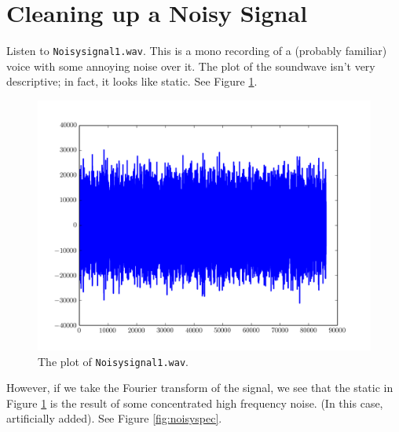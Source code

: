 

\section*{Cleaning up a Noisy Signal}

Listen to \texttt{Noisysignal1.wav}.
This is a mono recording of a (probably familiar) voice with some annoying noise over it.
The plot of the soundwave isn't very descriptive; in fact, it looks like static.
See Figure \ref{fig:noisysignal}.

\begin{figure}
\centering
\includegraphics[width=\textwidth]{figures/noisy}
\caption{The plot of \texttt{Noisysignal1.wav}.}
\label{fig:noisysignal}
\end{figure}

However, if we take the Fourier transform of the signal, we see that the static in Figure \ref{fig:noisysignal} is the result of some concentrated high frequency noise.
(In this case, artificially added).
See Figure \ref{fig:noisyspec}.

